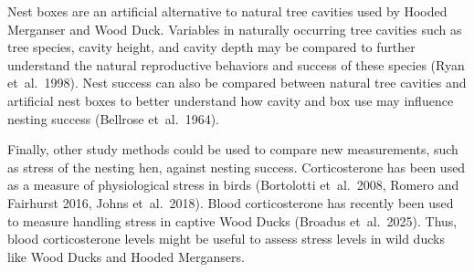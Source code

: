 Nest boxes are an artificial alternative to natural tree cavities used by Hooded Merganser and Wood Duck. Variables in naturally occurring tree cavities such as tree species, cavity height, and cavity depth may be compared to further understand the natural reproductive behaviors and success of these species (Ryan et~al.~1998). Nest success can also be compared between natural tree cavities and artificial nest boxes to better understand how cavity and box use may influence nesting success (Bellrose et~al.~1964).  

Finally, other study methods could be used to compare new measurements, such as stress of the nesting hen, against nesting success. Corticosterone has been used as a measure of physiological stress in birds (Bortolotti et~al.~2008, Romero and Fairhurst 2016, Johns et~al.~2018). Blood corticosterone has recently been used to measure handling stress in captive Wood Ducks (Broadus et~al.~2025). Thus, blood corticosterone levels might be useful to assess stress levels in wild ducks like Wood Ducks and Hooded Mergansers.  

